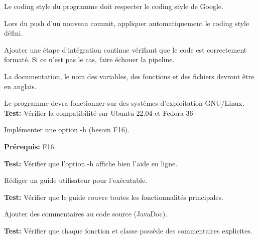 \documentclass{article}
\begin{document}
\begin{nonfunctionnalneedbox}
    Le coding style du programme doit respecter le coding style de Google.
    \begin{subneedbox}
        Lors du push d'un nouveau commit, appliquer automatiquement le coding style défini.
    \end{subneedbox}
    \begin{subneedbox}
        Ajouter une étape d'intégration continue vérifiant que le code est correctement formaté.
        Si ce n'est pas le cas, faire échouer la pipeline.
    \end{subneedbox}
\end{nonfunctionnalneedbox}

\begin{nonfunctionnalneedbox}
    La documentation, le nom des variables, des fonctions et des fichiers devront être en anglais.
\end{nonfunctionnalneedbox}

\begin{nonfunctionnalneedbox}
    Le programme devra fonctionner sur des systèmes d’exploitation GNU/Linux. \\
    \textbf{Test:} Vérifier la compatibilité sur Ubuntu 22.04 et Fedora 36
\end{nonfunctionnalneedbox}

\begin{nonfunctionnalneedbox}[F5. Documentation]
    
    \begin{subneedbox}[F5.1: Option -h]
        Implémenter une option -h (besoin F16).

        \textbf{Prérequis:} F16.

        \textbf{Test:} Vérifier que l'option -h affiche bien l'aide en ligne.
    \end{subneedbox}
    
    \begin{subneedbox}
        Rédiger un guide utilisateur pour l'exécutable.

        \textbf{Test:} Vérifier que le guide couvre toutes les fonctionnalités principales.
    \end{subneedbox}
    
    \begin{subneedbox}
        Ajouter des commentaires au code source (JavaDoc).

        \textbf{Test:} Vérifier que chaque fonction et classe possède des commentaires explicites.
    \end{subneedbox}
\end{nonfunctionnalneedbox}
\end{document}

